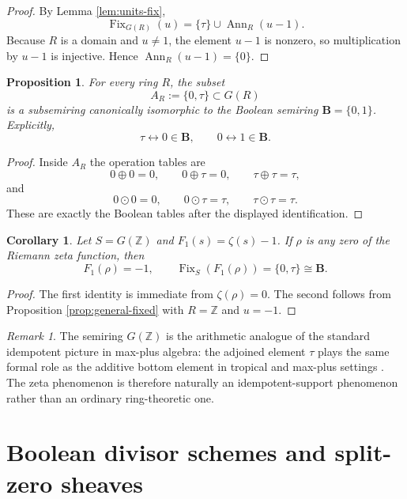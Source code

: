 \documentclass[11pt,a4paper]{article}
\newtheorem{proposition}[theorem]{Proposition}
\newtheorem{corollary}[theorem]{Corollary}
\theoremstyle{definition}
\theoremstyle{remark}
\newtheorem{remark}[theorem]{Remark}
\DeclareMathOperator{\Fix}{Fix}
\DeclareMathOperator{\Ann}{Ann}
\newcommand{\ZZ}{\mathbb Z}
\newcommand{\BB}{\mathbf B}
\newcommand{\taup}{\tau}
\begin{document}
\begin{proof}
By Lemma \ref{lem:units-fix},
\[
\Fix_{G(R)}(u)=\{\taup\}\cup\Ann_R(u-1).
\]
Because $R$ is a domain and $u\neq1$, the element $u-1$ is nonzero, so multiplication by $u-1$ is injective.  Hence $\Ann_R(u-1)=\{0\}$.
\end{proof}

\begin{proposition}\label{prop:boolean-pair}
For every ring $R$, the subset
\[
A_R:=\{0,\taup\}\subset G(R)
\]
is a subsemiring canonically isomorphic to the Boolean semiring $\BB=\{0,1\}$.  Explicitly,
\[
\taup\longleftrightarrow 0\in\BB,
\qquad
0\longleftrightarrow 1\in\BB.
\]
\end{proposition}

\begin{proof}
Inside $A_R$ the operation tables are
\[
0\oplus0=0,
\qquad
0\oplus\taup=0,
\qquad
\taup\oplus\taup=\taup,
\]
and
\[
0\odot0=0,
\qquad
0\odot\taup=\taup,
\qquad
\taup\odot\taup=\taup.
\]
These are exactly the Boolean tables after the displayed identification.
\end{proof}

\begin{corollary}\label{cor:zeta-pointwise}
Let $S=G(\ZZ)$ and $F_1(s)=\zeta(s)-1$.  If $\rho$ is any zero of the Riemann zeta function, then
\[
F_1(\rho)=-1,
\qquad
\Fix_S(F_1(\rho))=\{0,\taup\}\cong\BB.
\]
\end{corollary}

\begin{proof}
The first identity is immediate from $\zeta(\rho)=0$.  The second follows from Proposition \ref{prop:general-fixed} with $R=\ZZ$ and $u=-1$.
\end{proof}

\begin{remark}
The semiring $G(\ZZ)$ is the arithmetic analogue of the standard idempotent picture in max-plus algebra: the adjoined element $\taup$ plays the same formal role as the additive bottom element in tropical and max-plus settings \cite{GaubertKatz,Gunawardena}.  The zeta phenomenon is therefore naturally an idempotent-support phenomenon rather than an ordinary ring-theoretic one.
\end{remark}

\section{Boolean divisor schemes and split-zero sheaves}
\end{document}

